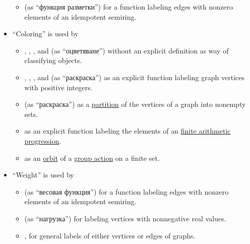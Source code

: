 \begin{remark}
\begin{itemize}
\begin{itemize}
      \item {} (as \enquote{функция разметки}) for a function labeling edges with nonzero elements of an idempotent semiring.
    \end{itemize}

    \item \enquote{Coloring} is used by
    \begin{itemize}
      \item {}, , ,  and  (as \enquote{оцветяване}) without an explicit definition as way of classifying objects.

      \item {}, , ,  and  (as \enquote{раскраска}) as an explicit function labeling graph vertices with positive integers.

      \item {} (as \enquote{раскраска}) as a \hyperref[def:set_partition]{partition} of the vertices of a graph into nonempty sets.

      \item {} as an explicit function labeling the elements of an \hyperref[def:arithmetic_progression]{finite arithmetic progression}.

      \item {} as an \hyperref[def:group_action_orbit]{orbit} of a \hyperref[def:group_action]{group action} on a finite set.
    \end{itemize}

    \item \enquote{Weight} is used by
    \begin{itemize}
      \item {} (as \enquote{весовая функция}) for a function labeling edges with nonzero elements of an idempotent semiring.

      \item {} (as \enquote{нагрузка}) for labeling vertices with nonnegative real values.

      \item {},  for general labels of either vertices or edges of graphs.


\end{itemize}
\end{itemize}
\end{remark}
